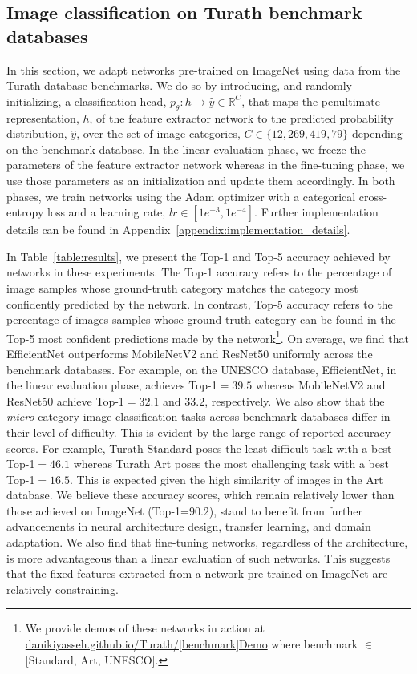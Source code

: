 \documentclass{article}
\begin{document}
\subsection{Image classification on Turath benchmark databases}

In this section, we adapt networks pre-trained on ImageNet using data from the Turath database benchmarks. We do so by introducing, and randomly initializing, a classification head, $p_{\theta}: h \rightarrow \hat{y} \in \mathbb{R}^{C}$, that maps the penultimate representation, $h$, of the feature extractor network to the predicted probability distribution, $\hat{y}$, over the set of image categories, $C \in \{12,269,419,79\}$ depending on the benchmark database. In the linear evaluation phase, we freeze the parameters of the feature extractor network whereas in the fine-tuning phase, we use those parameters as an initialization and update them accordingly. In both phases, we train networks using the Adam optimizer with a categorical cross-entropy loss and a learning rate, $lr \in [1e^{-3}, 1e^{-4}]$. Further implementation details can be found in Appendix~\ref{appendix:implementation_details}. 

In Table~\ref{table:results}, we present the Top-1 and Top-5 accuracy achieved by networks in these experiments. The Top-1 accuracy refers to the percentage of image samples whose ground-truth category matches the category most confidently predicted by the network. In contrast, Top-5 accuracy refers to the percentage of images samples whose ground-truth category can be found in the Top-5 most confident predictions made by the network\footnote{We provide demos of these networks in action at \url{danikiyasseh.github.io/Turath/[benchmark]Demo} where benchmark $\in$ [Standard, Art, UNESCO].}. On average, we find that EfficientNet outperforms MobileNetV2 and ResNet50 uniformly across the benchmark databases. For example, on the UNESCO database, EfficientNet, in the linear evaluation phase, achieves Top-1$= 39.5$ whereas MobileNetV2 and ResNet50 achieve Top-1$= 32.1$ and $33.2$, respectively. We also show that the \textit{micro} category image classification tasks across benchmark databases differ in their level of difficulty. This is evident by the large range of reported accuracy scores. For example, Turath Standard poses the least difficult task with a best Top-1$=46.1$ whereas Turath Art poses the most challenging task with a best Top-1$=16.5$. This is expected given the high similarity of images in the Art database. We believe these accuracy scores, which remain relatively lower than those achieved on ImageNet (Top-1=$90.2$), stand to benefit from further advancements in neural architecture design, transfer learning, and domain adaptation. We also find that fine-tuning networks, regardless of the architecture, is more advantageous than a linear evaluation of such networks. This suggests that the fixed features extracted from a network pre-trained on ImageNet are relatively constraining.
\end{document}
